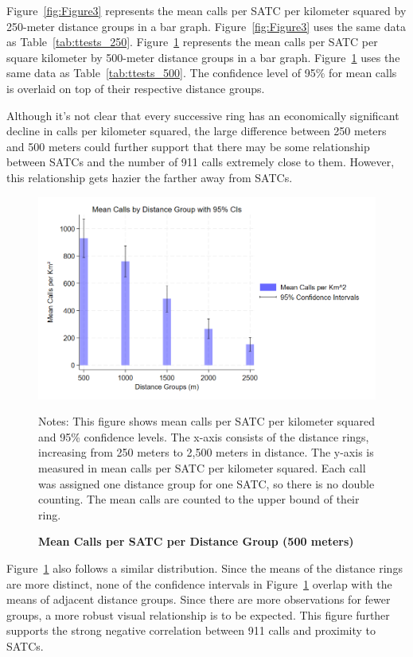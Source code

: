 \documentclass[12pt]{article}
\begin{document}
Figure~\ref{fig:Figure3} represents the mean calls per SATC per kilometer squared by 250-meter distance groups in a bar graph. Figure~\ref{fig:Figure3} uses the same data as Table~\ref{tab:ttests_250}. Figure~\ref{fig:Figure4} represents the mean calls per SATC per square kilometer by 500-meter distance groups in a bar graph. Figure~\ref{fig:Figure4} uses the same data as Table~\ref{tab:ttests_500}. The confidence level of 95\% for mean calls is overlaid on top of their respective distance groups. 

Although it's not clear that every successive ring has an economically significant decline in calls per kilometer squared, the large difference between 250 meters and 500 meters could further support that there may be some relationship between SATCs and the number of 911 calls extremely close to them. However, this relationship gets hazier the farther away from SATCs.

\begin{figure}[H]
    \centering
\includegraphics[width=0.75\linewidth]{Reproducibility Package/Downloaded_calls/Visual_Graphics_Downloaded_calls/500_CI_Graph.png}
    \caption{\textbf{Mean Calls per SATC per Distance Group (500 meters)}}
    \label{fig:Figure4}
    \centering\footnotesize{Notes: This figure shows mean calls per SATC per kilometer squared and 95\% confidence levels. The x-axis consists of the distance rings, increasing from 250 meters to 2,500 meters in distance. The y-axis is measured in mean calls per SATC per kilometer squared. Each call was assigned one distance group for one SATC, so there is no double counting. The mean calls are counted to the upper bound of their ring.}
\end{figure}

Figure~\ref{fig:Figure4} also follows a similar distribution. Since the means of the distance rings are more distinct, none of the confidence intervals in Figure~\ref{fig:Figure4} overlap with the means of adjacent distance groups. Since there are more observations for fewer groups, a more robust visual relationship is to be expected. This figure further supports the strong negative correlation between 911 calls and proximity to SATCs. 
\end{document}
